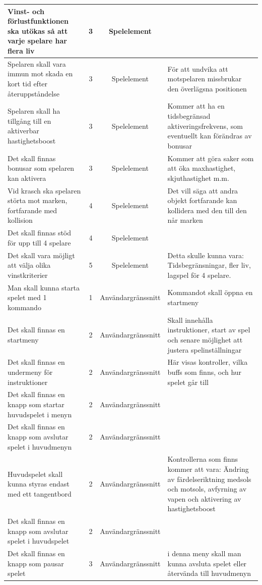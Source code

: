 \documentclass[12pt,a4paper]{article}
\begin{document}
\begin{longtable}{ | p{3.5cm} | c | c | p{3.5cm} | }
	Vinst- och förlustfunktionen ska utökas så att varje spelare har flera liv & 3 & Spelelement & \\ \hline
	Spelaren skall vara immun mot skada en kort tid efter återuppståndelse & 3 & Spelelement & För att undvika att motspelaren missbrukar den överlägsna positionen\\ \hline
	Spelaren skall ha tillgång till en aktiverbar hastighetsboost & 3 & Spelelement & Kommer att ha en tidsbegränsad aktiveringsfrekvens, som eventuellt kan förändras av bonusar\\ \hline
	Det skall finnas bonusar som spelaren kan aktivera & 3 & Spelelement & Kommer att göra saker som att öka maxhastighet, skjuthastighet m.m.\\ \hline
	Vid krasch ska spelaren störta mot marken, fortfarande med kollision & 4 & Spelelement & Det vill säga att andra objekt fortfarande kan kollidera med den till den når marken\\ \hline
	Det skall finnas stöd för upp till 4 spelare & 4 & Spelelement & \\ \hline
	Det skall vara möjligt att välja olika vinstkriterier & 5 & Spelelement & Detta skulle kunna vara: Tidsbegränsningar, fler liv, lagspel för 4 spelare.\\ \hline
	Man skall kunna starta spelet med 1 kommando & 1 & Användargränssnitt & Kommandot skall öppna en startmeny\\ \hline
	Det skall finnas en startmeny & 2 & Användargränssnitt & Skall innehålla instruktioner, start av spel och senare möjlighet att justera spelinställningar\\ \hline
	Det skall finnas en undermeny för instruktioner & 2 & Användargränssnitt & Här visas kontroller, vilka buffs som finns, och hur spelet går till\\ \hline
	Det skall finnas en knapp som startar huvudspelet i menyn & 2 & Användargränssnitt & \\ \hline
	Det skall finnas en knapp som avslutar spelet i huvudmenyn & 2 & Användargränssnitt & \\ \hline
	Huvudspelet skall kunna styras endast med ett tangentbord & 2 & Användargränssnitt & Kontrollerna som finns kommer att vara: Ändring av färdelseriktning medsols och motsols, avfyrning av vapen och aktivering av hastighetsboost\\ \hline
	Det skall finnas en knapp som avslutar spelet i huvudspelet & 2 & Användargränssnitt & \\ \hline
	Det skall finnas en knapp som pausar spelet & 3 & Användargränssnitt & i denna meny skall man kunna avsluta spelet eller återvända till huvudmenyn\\ \hline

\end{longtable}
\end{document}

